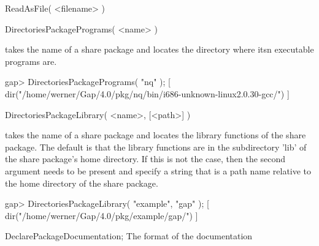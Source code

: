 \>ReadAsFile( <filename> )

\>DirectoriesPackagePrograms( <name> )

takes the name of a share package and locates the directory where itsn
executable programs are.

\begintt
gap> DirectoriesPackagePrograms( "nq" );    
[ dir("/home/werner/Gap/4.0/pkg/nq/bin/i686-unknown-linux2.0.30-gcc/") ]
\endtt

\>DirectoriesPackageLibrary( <name>, [<path>] )

takes  the name of a share  package and locates  the library functions of
the share package.  The default is that the  library functions are in the
subdirectory 'lib' of the share package's home directory.  If this is not
the case, then the  second  argument needs to   be present and specify  a
string that is  a path name relative to  the home directory of  the share
package.

\begintt
gap> DirectoriesPackageLibrary( "example", "gap" );  
[ dir("/home/werner/Gap/4.0/pkg/example/gap/") ]
\endtt


DeclarePackageDocumentation;
The format of the documentation



